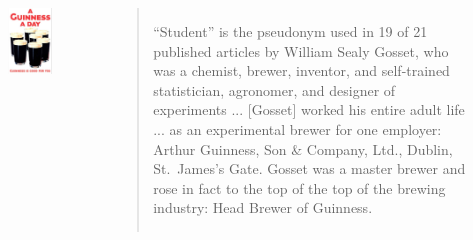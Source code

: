 \begin{frame}
\begin{columns}
\begin{figure}
\includegraphics[scale = 0.17]{./images/guinness}
\end{figure}


\footnotesize
\begin{quote}
``Student'' is the pseudonym used in 19 of 21 published articles by William Sealy
Gosset, who was a chemist, brewer, inventor, and self-trained statistician, agronomer, and designer of experiments ... [Gosset] worked his entire adult life ... as an experimental brewer for one employer: Arthur Guinness, Son \& Company, Ltd., Dublin, St.\ James’s Gate. Gosset was a master brewer and rose in fact to the top of the top of the brewing industry: Head Brewer of Guinness.
\end{quote}

\end{columns}

\end{frame}


